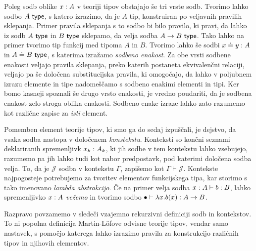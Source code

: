 Poleg sodb oblike \(x : A\) v teoriji tipov obstajajo še tri vrste sodb.
Tvorimo lahko sodbo \(A\ \textnormal{\textsf{type}}\), s katero izrazimo, da je \(A\) tip, konstruiran po veljavnih pravilih sklepanja.
Primer pravila sklepanja s to sodbo bi bilo pravilo, ki pravi, da lahko iz sodb \(A\ \textnormal{\textsf{type}}\) in \(B\ \textnormal{\textsf{type}}\) sklepamo, da velja sodba \(A \to B\ \textnormal{\textsf{type}}\). Tako lahko na primer tvorimo tip funkcij med tipoma \(A\) in \(B\).
Tvorimo lahko še sodbi \(x \doteq y : A\) in \(A \doteq B\ \textnormal{\textsf{type}}\),
s katerima izražamo \emph{sodbeno enakost}. Za obe vrsti sodbene enakosti veljajo pravila
sklepanja, preko katerih postaneta ekvivalenčni relaciji,
veljajo pa še določena substitucijska
pravila, ki omogočajo, da lahko v poljubnem izrazu elemente in tipe nadomeščamo s sodbeno
enakimi elementi in tipi. Ker bomo kasneji spoznali še drugo vrsto enakosti, je vredno
poudariti, da je sodbena enakost zelo stroga oblika enakosti. Sodbeno enake izraze lahko
zato razumemo kot različne zapise za \emph{isti} element.

Pomemben element teorije tipov, ki smo ga do sedaj izpuščali, je dejstvo,
da vsaka sodba nastopa v določenem \emph{konstekstu}. Konteksti so končni seznami
deklariranih spremenljivk \(x_k : A_{k}\), ki jih sodbe v tem kontekstu
lahko vsebujejo, razumemo pa jih lahko tudi kot nabor predpostavk, pod katerimi določena
sodba velja.  To, da je \(\mathcal{J}\) sodba v kontekstu \(\Gamma\), zapišemo kot \(\Gamma \vdash \mathcal{J}\).
Kontekste najpogosteje potrebujemo za tvoritev elementov funkcijskega tipa, kar storimo s tako imenovano \emph{lambda abstrakcijo}. Če na primer velja sodba \(x : A \vdash b : B\), lahko spremenljivko \(x : A\) \emph{vežemo} in tvorimo sodbo \(\bullet \vdash \lambda x.b(x) : A \to B\).

Razpravo povzamemo v sledeči vzajemno rekurzivni definiciji sodb in kontekstov. To ni popolna definicija Martin-Löfove odvisne teorije tipov, vendar samo nastavek, s pomočjo katerega lahko izrazimo pravila za konstrukcijo različnih tipov in njihovih elementov.

